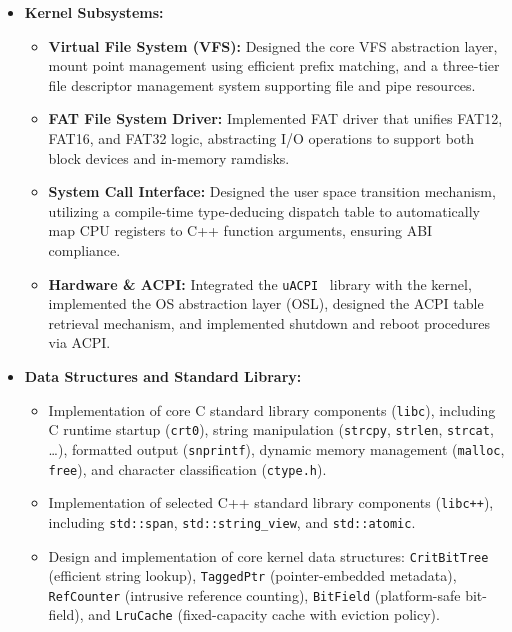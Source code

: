 \documentclass[a4paper,10pt,twoside]{report}
\theoremstyle{definition}
\begin{document}
\begin{itemize}
\begin{itemize}
        \item Chapter \ref{chap:users_manual} --- User's Manual
    \end{itemize}

    \item \textbf{Kernel Subsystems:}
    \begin{itemize}
        \item \textbf{Virtual File System (VFS):} Designed the core VFS abstraction layer, mount point management using efficient prefix matching, and a three-tier file descriptor management system supporting file and pipe resources.
        \item \textbf{FAT File System Driver:} Implemented FAT driver that unifies FAT12, FAT16, and FAT32 logic, abstracting I/O operations to support both block devices and in-memory ramdisks.
        \item \textbf{System Call Interface:} Designed the user space transition mechanism, utilizing a compile-time type-deducing dispatch table to automatically map CPU registers to C++ function arguments, ensuring ABI compliance.
        \item \textbf{Hardware \& ACPI:} Integrated the \texttt{uACPI}~\cite{uacpi_repo} library with the kernel, implemented the OS abstraction layer (OSL), designed the ACPI table retrieval mechanism, and implemented shutdown and reboot procedures via ACPI.
    \end{itemize}

    \item \textbf{Data Structures and Standard Library:}
    \begin{itemize}
        \item Implementation of core C standard library components (\texttt{libc}), including C runtime startup (\texttt{crt0}), string manipulation (\texttt{strcpy}, \texttt{strlen}, \texttt{strcat}, \dots), formatted output (\texttt{snprintf}), dynamic memory management (\texttt{malloc}, \texttt{free}), and character classification (\texttt{ctype.h}).
        \item Implementation of selected C++ standard library components (\texttt{libc++}), including \texttt{std::span}, \texttt{std::string\_view}, and \texttt{std::atomic}.
        \item Design and implementation of core kernel data structures: \texttt{CritBitTree} (efficient string lookup), \texttt{TaggedPtr} (pointer-embedded metadata), \texttt{RefCounter} (intrusive reference counting), \texttt{BitField} (platform-safe bit-field), and \texttt{LruCache} (fixed-capacity cache with eviction policy).
    \end{itemize}


\end{itemize}
\end{document}
